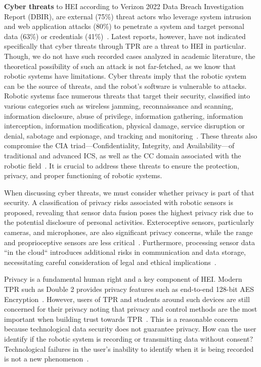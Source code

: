 \textbf{Cyber threats} to \ac{HEI} according to Verizon 2022 Data Breach Investigation Report (DBIR), are external (75\%) threat actors
who leverage system intrusion and web application attacks
(80\%) to penetrate a system and target personal data (63\%) or credentials (41\%)~\cite[57]{dbir_2022}. Latest reports, however, have not
indicated specifically that cyber threats through \ac{TPR} are a threat to \ac{HEI} in particular. Though, we do not
have such recorded cases analyzed in academic literature, the theoretical possibility of such an attack is not far-fetched, as we
know that robotic systems have limitations. Cyber threats imply that the robotic system can be the source of threats, and the robot's software is vulnerable to attacks. Robotic systems face numerous threats that target their security, classified into various categories such as wireless jamming,
reconnaissance and scanning, information disclosure, abuse of privilege, information gathering, information interception, information
modification, physical damage, service disruption or denial, sabotage and espionage, and tracking and monitoring~\cite[122]{robotics_cyber_security_2022}. These threats also
compromise the CIA triad—Confidentiality, Integrity, and Availability—of traditional and advanced \ac{ICS}, as
well as the \ac{CC} domain associated with the robotic field~\cite[116]{robotics_cyber_security_2022}. It is crucial to address these threats to ensure the protection, privacy, and proper functioning of robotic systems.

When discussing cyber threats, we must consider whether privacy is part of that security. A classification of privacy risks
associated with robotic sensors is proposed, revealing that sensor data fusion poses the highest privacy risk due to the potential
disclosure of personal activities. Exteroceptive sensors, particularly cameras, and microphones, are also significant privacy concerns,
while the range and proprioceptive sensors are less critical~\cite[81]{cyber_sec_robotics_privacy_safety_2017}. Furthermore, processing
sensor data ``in the cloud`` introduces
additional risks in communication and data storage, necessitating careful consideration of legal and ethical implications~\cite[82-84]{cyber_sec_robotics_privacy_safety_2017}.

Privacy is a fundamental human right and a key component of \ac{HEI}. Modern \ac{TPR} such as Double 2 provides privacy features such as
end-to-end 128-bit AES Encryption~\cite[544]{telepresence_robots_in_classroom_2019}. However, users of \ac{TPR} and students around such devices are still concerned for
their privacy noting that privacy and control methods are the
most important when building trust towards \ac{TPR}~\cite[59]{telepresence_perspective_psychology_educational_2022}.
This is a reasonable concern because technological data security does not guarantee privacy. How can the user identify if the robotic
system is recording or transmitting data without consent? Technological failures in the user's inability to identify when it is being recorded is not a new phenomenon~\cite[]{is_my_phone_listening_2019}.

